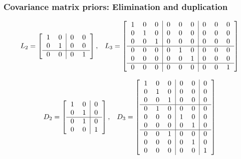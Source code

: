 \documentclass[xcolor=dvipsnames]{beamer}
\begin{document}
\begin{frame}
\frametitle{Covariance matrix priors: Elimination and duplication}
\begin{align*}
L_2 = \left[\begin{tabular}{cc|cc} 1 & 0 & 0 & 0 \\ 0 & 1 & 0 & 0 \\\hline 0 & 0 & 0 & 1 \end{tabular}\right], && L_3 =  \left[\begin{tabular}{ccc|ccc|ccc}
1 & 0 & 0 & 0 & 0 & 0 & 0 & 0 & 0  \\ 
0 & 1 & 0 & 0 & 0 & 0 & 0 & 0 & 0 \\ 
0 & 0 & 1 & 0 & 0 & 0 & 0 & 0 & 0 \\\hline
0 & 0 & 0 & 0 & 1 & 0 & 0 & 0 & 0 \\
0 & 0 & 0 & 0 & 0 & 1 & 0 & 0 & 0 \\\hline
0 & 0 & 0 & 0 & 0 & 0 & 0 & 0 & 1 \\
\end{tabular}\right]
\end{align*}

\pause\begin{align*}
D_2 = \left[\begin{tabular}{cc|c} 1 & 0 & 0 \\ 0 & 1 &  0 \\\hline 0 & 1 & 0\\ 0 & 0 & 1 \end{tabular}\right], && D_3 =  \left[\begin{tabular}{ccc|cc|c}
1 & 0 & 0 & 0 & 0 & 0 \\ 
0 & 1 & 0 & 0 & 0 & 0 \\ 
0 & 0 & 1 & 0 & 0 & 0 \\\hline
0 & 1 & 0 & 0 & 0 & 0 \\
0 & 0 & 0 & 1 & 0 & 0 \\
0 & 0 & 0 & 0 & 1 & 0 \\\hline
0 & 0 & 1 & 0 & 0 & 0 \\
0 & 0 & 0 & 0 & 1 & 0 \\
0 & 0 & 0 & 0 & 0 & 1
\end{tabular}\right]
\end{align*}
\end{frame}
\end{document}

